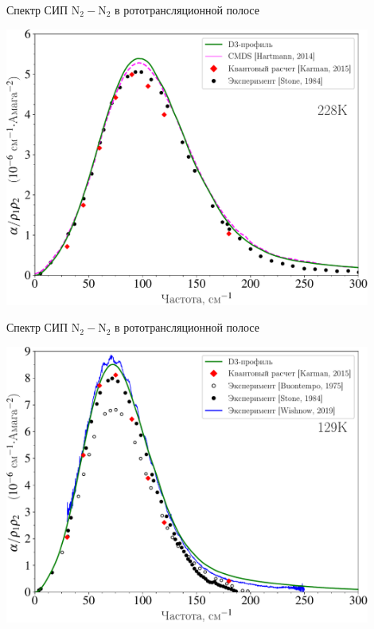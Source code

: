 \documentclass[10pt,usenames,pdf,hyperref={unicode},dvipsnames]{beamer}
\begin{document}
\begin{frame}{Спектр СИП N$_2-$N$_2$ в рототрансляционной полосе}
	\begin{center}
		\includegraphics[width=0.9\textwidth]{./pictures/228K_russian_legend-crop.pdf}
	\end{center}
\end{frame}

\begin{frame}{Спектр СИП N$_2-$N$_2$ в рототрансляционной полосе}
	\begin{center}
		\includegraphics[width=0.9\textwidth]{./pictures/129K_russian_legend-crop.pdf}
	\end{center}
\end{frame}
\end{document}
